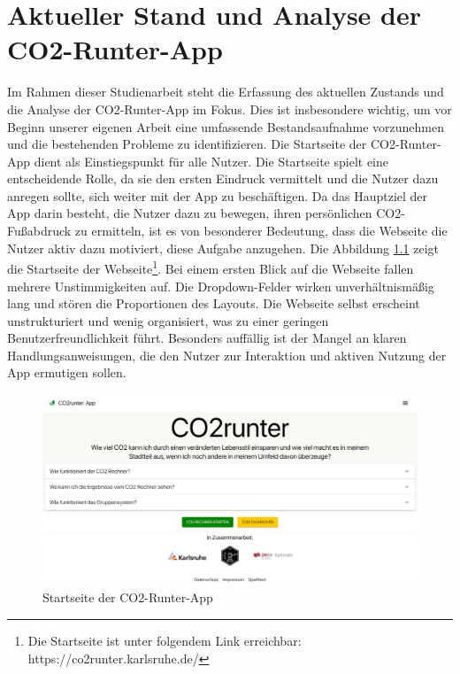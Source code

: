 
\chapter{Aktueller Stand und Analyse der CO2-Runter-App}
\label{chapter:2}

Im Rahmen dieser Studienarbeit steht die Erfassung des aktuellen Zustands und die Analyse der CO2-Runter-App im Fokus. Dies ist insbesondere wichtig, um vor Beginn unserer eigenen Arbeit eine umfassende Bestandsaufnahme vorzunehmen und die bestehenden Probleme zu identifizieren. Die Startseite der CO2-Runter-App dient als Einstiegspunkt für alle Nutzer. Die Startseite spielt eine entscheidende Rolle, da sie den ersten Eindruck vermittelt und die Nutzer dazu anregen sollte, sich weiter mit der App zu beschäftigen. Da das Hauptziel der App darin besteht, die Nutzer dazu zu bewegen, ihren persönlichen CO2-Fußabdruck zu ermitteln, ist es von besonderer Bedeutung, dass die Webseite die Nutzer aktiv dazu motiviert, diese Aufgabe anzugehen. Die Abbildung \ref{fig:co2runterapp-landingpage} zeigt die Startseite der Webseite\footnote{Die Startseite ist unter folgendem Link erreichbar: https://co2runter.karlsruhe.de/}. Bei einem ersten Blick auf die Webseite fallen mehrere Unstimmigkeiten auf. Die Dropdown-Felder wirken unverhältnismäßig lang und stören die Proportionen des Layouts. Die Webseite selbst erscheint unstrukturiert und wenig organisiert, was zu einer geringen Benutzerfreundlichkeit führt. Besonders auffällig ist der Mangel an klaren Handlungsanweisungen, die den Nutzer zur Interaktion und aktiven Nutzung der App ermutigen sollen.

\begin{figure}[h]
    \centering
    \includegraphics[width=1\textwidth]{images/02/CO2-Runter-App-Landingpage.jpeg}
    \caption{Startseite der CO2-Runter-App}
    \label{fig:co2runterapp-landingpage}
\end{figure}

